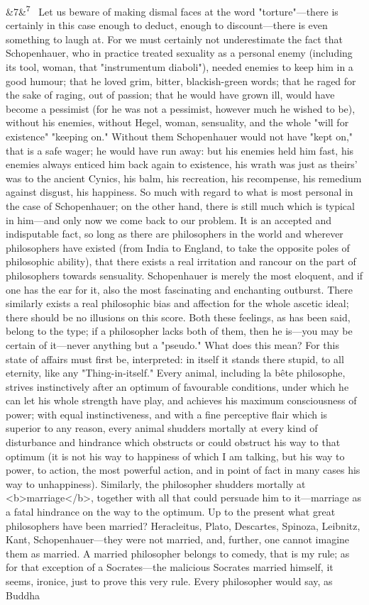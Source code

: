 \documentclass[12pt]{article}
\newcommand{\para}[1][]{\par\noindent\ifx&#1&\else\textsuperscript{\footnotesize #1}~\fi}
\begin{document}
\para[7] Let us beware of making dismal faces at the word "torture"---there is certainly in this case enough to deduct, enough to discount---there is even something to laugh at. For we must certainly not underestimate the fact that Schopenhauer, who in practice treated sexuality as a personal enemy (including its tool, woman, that "instrumentum diaboli"), needed enemies to keep him in a good humour; that he loved grim, bitter, blackish-green words; that he raged for the sake of raging, out of passion; that he would have grown ill, would have become a pessimist (for he was not a pessimist, however much he wished to be), without his enemies, without Hegel, woman, sensuality, and the whole "will for existence" "keeping on." Without them Schopenhauer would not have "kept on," that is a safe wager; he would have run away: but his enemies held him fast, his enemies always enticed him back again to existence, his wrath was just as theirs' was to the ancient Cynics, his balm, his recreation, his recompense, his remedium against disgust, his happiness. So much with regard to what is most personal in the case of Schopenhauer; on the other hand, there is still much which is typical in him---and only now we come back to our problem. It is an accepted and indisputable fact, so long as there are philosophers in the world and wherever philosophers have existed (from India to England, to take the opposite poles of philosophic ability), that there exists a real irritation and rancour on the part of philosophers towards sensuality. Schopenhauer is merely the most eloquent, and if one has the ear for it, also the most fascinating and enchanting outburst. There similarly exists a real philosophic bias and affection for the whole ascetic ideal; there should be no illusions on this score. Both these feelings, as has been said, belong to the type; if a philosopher lacks both of them, then he is---you may be certain of it---never anything but a "pseudo." What does this mean? For this state of affairs must first be, interpreted: in itself it stands there stupid, to all eternity, like any "Thing-in-itself." Every animal, including la bête philosophe, strives instinctively after an optimum of favourable conditions, under which he can let his whole strength have play, and achieves his maximum consciousness of power; with equal instinctiveness, and with a fine perceptive flair which is superior to any reason, every animal shudders mortally at every kind of disturbance and hindrance which obstructs or could obstruct his way to that optimum (it is not his way to happiness of which I am talking, but his way to power, to action, the most powerful action, and in point of fact in many cases his way to unhappiness). Similarly, the philosopher shudders mortally at <b>marriage</b>, together with all that could persuade him to it---marriage as a fatal hindrance on the way to the optimum. Up to the present what great philosophers have been married? Heracleitus, Plato, Descartes, Spinoza, Leibnitz, Kant, Schopenhauer---they were not married, and, further, one cannot imagine them as married. A married philosopher belongs to comedy, that is my rule; as for that exception of a Socrates---the malicious Socrates married himself, it seems, ironice, just to prove this very rule. Every philosopher would say, as Buddha 
\end{document}

